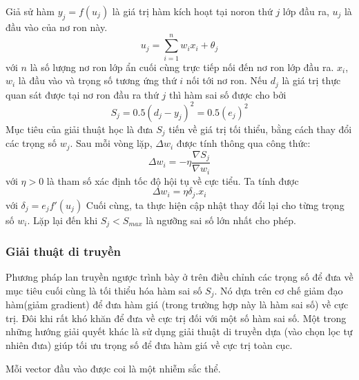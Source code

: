 	Giả sử hàm $y_j=f(u_j)$ là giá trị hàm kích hoạt tại noron thứ $j$ lớp đầu ra, $u_j$ là đầu vào của nơ ron này. 
	\begin{equation}
		u_j = \sum\limits_{i=1}^{n}w_ix_i + \theta_j
	\end{equation}
	với  $n$ là số lượng nơ ron lớp ẩn cuối cùng trực tiếp nối đến nơ ron lớp đầu ra. $x_i$,$w_i$ là đầu vào và trọng số tương ứng thứ $i$ nối tới nơ ron. Nếu $d_j$ là giá trị thực quan sát được tại nơ ron đầu ra thứ $j$ thì hàm sai số được cho bởi
	\begin{equation}
		S_j = 0.5(d_j-y_j)^{2} = 0.5(e_j)^2
	\end{equation}
	Mục tiêu của giải thuật học là đưa $S_j$ tiến về giá trị tối thiểu, bằng cách thay đổi các trọng số $w_j$. Sau mỗi vòng lặp, $\Delta{w_i}$ được tính thông qua công thức:
	\begin{equation}
		\Delta{w_i} = -\eta\frac{\nabla {S_j}}{\nabla{w_i}}
	\end{equation}
	với $\eta > 0$ là tham số xác định tốc độ hội tụ về cực tiểu. Ta tính được 
	\begin{equation}
		\Delta{w_i} = \eta\delta_j.x_i
	\end{equation}
	 với $\delta_j = e_jf'(u_j)$
	 Cuối cùng, ta thực hiện cập nhật thay đổi lại cho từng trọng số $w_i$. Lặp lại đến khi $S_j < S_{max}$ là ngưỡng sai số lớn nhất cho phép. 
	 
\subsubsection{Giải thuật di truyền}
Phương pháp lan truyền ngược trình bày ở trên điều chỉnh các trọng số để đưa về mục tiêu cuối cùng là tối thiểu hóa hàm sai số $S_j$. Nó dựa trên cơ chế giảm đạo hàm(giảm gradient) để đưa 
hàm giá (trong trường hợp này là hàm sai số) về cực trị. Đôi khi rất khó khăn để đưa về cực trị đối với một số hàm sai số. Một trong những hướng giải quyết khác là sử dụng giải thuật di truyền dựa (vào chọn lọc tự nhiên đưa) giúp tối ưu trọng số để đưa hàm giá về cực trị toàn cục.

Mỗi vector đầu vào được coi là một nhiễm sắc thể.

